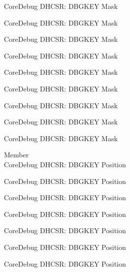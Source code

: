 \begin{DoxyRefList}
\label{deprecated__deprecated000559}%
%
Core\+Debug DHCSR\+: DBGKEY Mask 

\label{deprecated__deprecated000665}%
%
Core\+Debug DHCSR\+: DBGKEY Mask 

\label{deprecated__deprecated000765}%
%
Core\+Debug DHCSR\+: DBGKEY Mask 

\label{deprecated__deprecated000819}%
%
Core\+Debug DHCSR\+: DBGKEY Mask 

\label{deprecated__deprecated000904}%
%
Core\+Debug DHCSR\+: DBGKEY Mask 

\label{deprecated__deprecated000961}%
%
Core\+Debug DHCSR\+: DBGKEY Mask 

\label{deprecated__deprecated001037}%
%
Core\+Debug DHCSR\+: DBGKEY Mask 

\label{deprecated__deprecated001116}%
%
Core\+Debug DHCSR\+: DBGKEY Mask 

\label{deprecated__deprecated001218}%
%
Core\+Debug DHCSR\+: DBGKEY Mask  
\item[Member \doxylink{group___c_m_s_i_s___core_debug_gac91280edd0ce932665cf75a23d11d842}{Core\+Debug\+\_\+\+DHCSR\+\_\+\+DBGKEY\+\_\+\+Pos} ]\hfill \\
\label{deprecated__deprecated000005}%
%
Core\+Debug DHCSR\+: DBGKEY Position 

\label{deprecated__deprecated000105}%
%
Core\+Debug DHCSR\+: DBGKEY Position 

\label{deprecated__deprecated000159}%
%
Core\+Debug DHCSR\+: DBGKEY Position 

\label{deprecated__deprecated000244}%
%
Core\+Debug DHCSR\+: DBGKEY Position 

\label{deprecated__deprecated000301}%
%
Core\+Debug DHCSR\+: DBGKEY Position 

\label{deprecated__deprecated000377}%
%
Core\+Debug DHCSR\+: DBGKEY Position 

\label{deprecated__deprecated000456}%
%
Core\+Debug DHCSR\+: DBGKEY Position 


\end{DoxyRefList}
